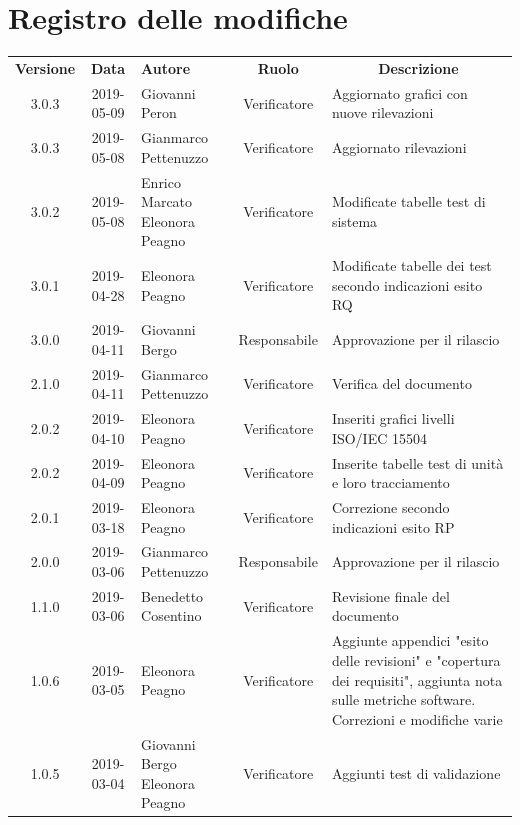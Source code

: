 \documentclass[11pt,a4paper]{article}
\begin{document}
	
	\newpage
	{\def\arraystretch{2}\tabcolsep=10pt
	
	\section*{\centering Registro delle modifiche}
	\begin{tabularx}{\textwidth}{ c | c | p{3.5cm} | c | X }
		\rowcolor{LightBlue}
		\color{white}\bfseries Versione & \color{white}\bfseries Data & \color{white}\bfseries Autore & \color{white}\bfseries Ruolo & \multicolumn{1}{c}{\color{white}\bfseries Descrizione}\\[0.25cm]
		3.0.3 & 2019-05-09 & Giovanni Peron & Verificatore & Aggiornato grafici con nuove rilevazioni \\ \hline
		3.0.3 & 2019-05-08 & Gianmarco Pettenuzzo & Verificatore & Aggiornato rilevazioni \\ \hline
		3.0.2 & 2019-05-08 & Enrico Marcato \newline Eleonora Peagno & Verificatore & Modificate tabelle test di sistema \\ \hline
		3.0.1 & 2019-04-28 & Eleonora Peagno & Verificatore & Modificate tabelle dei test secondo indicazioni esito RQ \\ \hline
		3.0.0 & 2019-04-11 & Giovanni Bergo & Responsabile & Approvazione per il rilascio \\ \hline
		2.1.0 & 2019-04-11 & Gianmarco Pettenuzzo & Verificatore & Verifica del documento \\ \hline
		2.0.2 & 2019-04-10 & Eleonora Peagno & Verificatore & Inseriti grafici livelli ISO/IEC 15504 \\ \hline
		2.0.2 & 2019-04-09 & Eleonora Peagno & Verificatore & Inserite tabelle test di unità e loro tracciamento \\ \hline
		2.0.1 & 2019-03-18 & Eleonora Peagno & Verificatore & Correzione secondo indicazioni esito RP \\ \hline
		2.0.0 & 2019-03-06 & Gianmarco Pettenuzzo & Responsabile & Approvazione per il rilascio \\ \hline
		1.1.0 & 2019-03-06 & Benedetto Cosentino & Verificatore & Revisione finale del documento \\ \hline
		1.0.6 & 2019-03-05 & Eleonora Peagno & Verificatore & Aggiunte appendici "esito delle revisioni" e "copertura dei requisiti", aggiunta nota sulle metriche software. Correzioni e modifiche varie \\ \hline
		1.0.5 & 2019-03-04 & Giovanni Bergo \newline Eleonora Peagno & Verificatore & Aggiunti test di validazione \\ \hline

\end{tabularx}}
\end{document}
